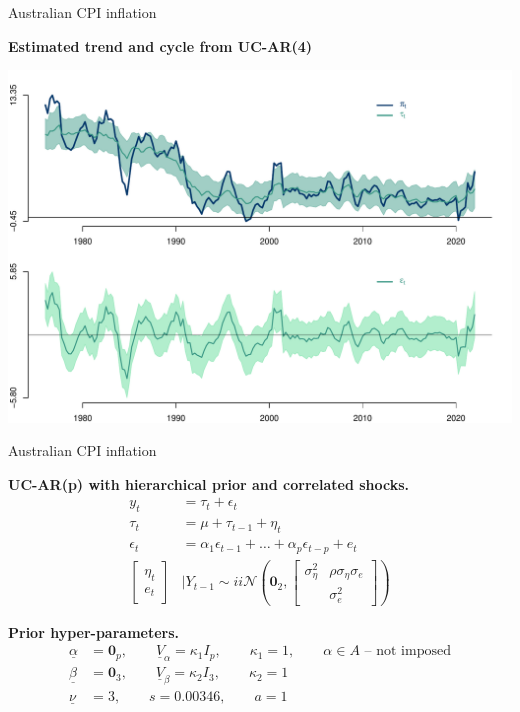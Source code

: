 \documentclass[notes,blackandwhite,mathsans,usenames,dvipsnames]{beamer}
\begin{document}
\begin{frame}{Australian CPI inflation}

\small
\centering
\smallskip\textbf{Estimated trend and cycle from UC-AR(4)}

\includegraphics[scale=0.4, trim=2cm 0.5cm 2cm 0cm]{results/pi-sigma-uc-ar4.pdf}

\end{frame}









\begin{frame}{Australian CPI inflation}

\bigskip\textbf{UC-AR(p) with hierarchical prior and correlated shocks.}
\begin{align*}
y_t &= \tau_t + \epsilon_t\\[1ex]
\tau_t &= \mu + \tau_{t-1} + \eta_t\\[1ex]
\epsilon_t &= \alpha_1\epsilon_{t-1} + \dots + \alpha_p\epsilon_{t-p} +  e_t\\[2ex]
\begin{bmatrix}\eta_t \\ e_t\end{bmatrix}&\bigg|Y_{t-1} \sim ii\mathcal{N}\left(\mathbf{0}_2, \begin{bmatrix}\sigma_\eta^2 & \rho\sigma_\eta\sigma_e \\  & \sigma_e^2\end{bmatrix} \right)
\end{align*}

\smallskip\textbf{Prior hyper-parameters.}
\begin{align*}
\underline\alpha &= \mathbf{0}_p,  \qquad\underline{V}_\alpha = \kappa_1I_p, \qquad\kappa_1=1, \qquad \alpha\in A\text{  -- not imposed}\\
\underline\beta &= \mathbf{0}_3,  \qquad\underline{V}_\beta = \kappa_2I_3, \qquad\kappa_2=1\\
\underline\nu &=3, \qquad s= 0.00346 , \qquad a= 1
\end{align*}

\end{frame}
\end{document}
